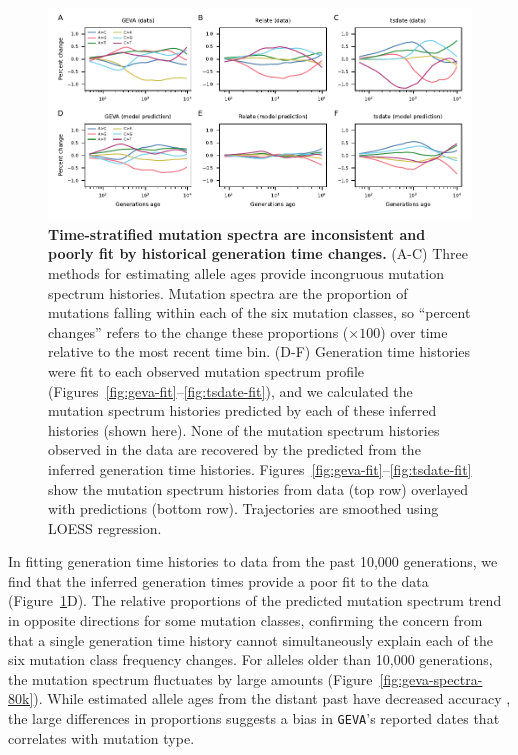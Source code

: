 \documentclass[]{article}
\newcommand{\GEVA}{\texttt{GEVA}\xspace}
\begin{document}
\begin{figure}[t!]
    \centering
    \includegraphics{../plots/fig1.pdf}
    \caption{
        \textbf{Time-stratified mutation spectra are inconsistent and poorly
        fit by historical generation time changes.} (A-C) Three methods for
        estimating allele ages provide incongruous mutation spectrum histories.
        Mutation spectra are the proportion of mutations falling within each
        of the six mutation classes, so ``percent changes'' refers to the
        change these proportions ($\times 100$) over time relative to the
        most recent time bin.
        (D-F) Generation time histories were fit to each observed mutation
        spectrum profile (Figures~\ref{fig:geva-fit}--\ref{fig:tsdate-fit}),
        and we calculated the mutation spectrum histories predicted by each of
        these inferred histories (shown here). None of the mutation spectrum
        histories observed in the data are recovered by the predicted from the
        inferred generation time histories.
        Figures~\ref{fig:geva-fit}--\ref{fig:tsdate-fit} show the mutation
        spectrum histories from data (top row) overlayed with predictions
        (bottom row). Trajectories are smoothed using LOESS regression.
    }
    \label{fig:spectrum-ages}
\end{figure}

In fitting generation time histories to data from the past 10,000 generations,
we find that the inferred generation times provide a poor fit to the data
(Figure~\ref{fig:spectrum-ages}D). The relative proportions of the predicted
mutation spectrum trend in opposite directions for some mutation classes,
confirming the concern from \citet{gao2023limited} that a single generation
time history cannot simultaneously explain each of the six mutation class
frequency changes. For alleles older than 10,000 generations, the mutation
spectrum fluctuates by large amounts (Figure~\ref{fig:geva-spectra-80k}). While
estimated allele ages from the distant past have decreased accuracy
\citep{albers2020dating,wang2023human}, the large differences in proportions
suggests a bias in \GEVA's reported dates that correlates with mutation type.
\end{document}
